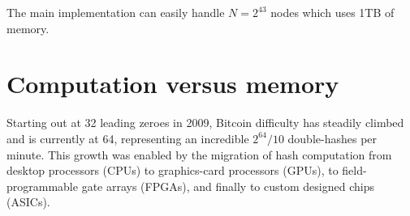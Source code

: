 \documentclass[11pt, oneside]{article}
\begin{document}
The main implementation can easily handle $N=2^{43}$ nodes which uses 1TB of memory.


\section{Computation versus memory}
Starting out at 32 leading zeroes in 2009, Bitcoin difficulty
has steadily climbed and is currently
at 64, representing an incredible $2^{64}/10$ double-hashes per minute.
This growth was enabled by the migration of hash computation from 
desktop processors (CPUs) to graphics-card processors (GPUs),
to field-programmable gate arrays (FPGAs), and finally to custom designed
chips (ASICs).
\end{document}
